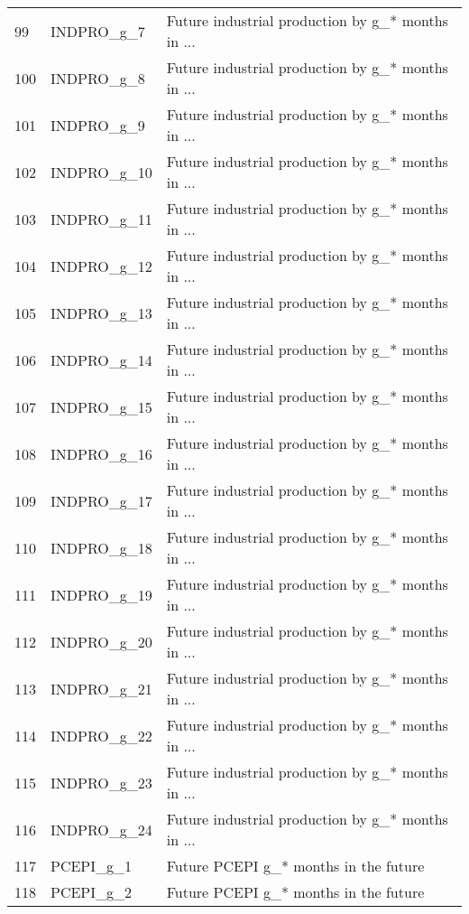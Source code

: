 \begin{tabular}{lll}
99  &                 INDPRO\_g\_7 &  Future industrial production by g\_* months in ... \\
100 &                 INDPRO\_g\_8 &  Future industrial production by g\_* months in ... \\
101 &                 INDPRO\_g\_9 &  Future industrial production by g\_* months in ... \\
102 &                INDPRO\_g\_10 &  Future industrial production by g\_* months in ... \\
103 &                INDPRO\_g\_11 &  Future industrial production by g\_* months in ... \\
104 &                INDPRO\_g\_12 &  Future industrial production by g\_* months in ... \\
105 &                INDPRO\_g\_13 &  Future industrial production by g\_* months in ... \\
106 &                INDPRO\_g\_14 &  Future industrial production by g\_* months in ... \\
107 &                INDPRO\_g\_15 &  Future industrial production by g\_* months in ... \\
108 &                INDPRO\_g\_16 &  Future industrial production by g\_* months in ... \\
109 &                INDPRO\_g\_17 &  Future industrial production by g\_* months in ... \\
110 &                INDPRO\_g\_18 &  Future industrial production by g\_* months in ... \\
111 &                INDPRO\_g\_19 &  Future industrial production by g\_* months in ... \\
112 &                INDPRO\_g\_20 &  Future industrial production by g\_* months in ... \\
113 &                INDPRO\_g\_21 &  Future industrial production by g\_* months in ... \\
114 &                INDPRO\_g\_22 &  Future industrial production by g\_* months in ... \\
115 &                INDPRO\_g\_23 &  Future industrial production by g\_* months in ... \\
116 &                INDPRO\_g\_24 &  Future industrial production by g\_* months in ... \\
117 &                  PCEPI\_g\_1 &              Future PCEPI g\_* months in the future \\
118 &                  PCEPI\_g\_2 &              Future PCEPI g\_* months in the future \\

\end{tabular}
